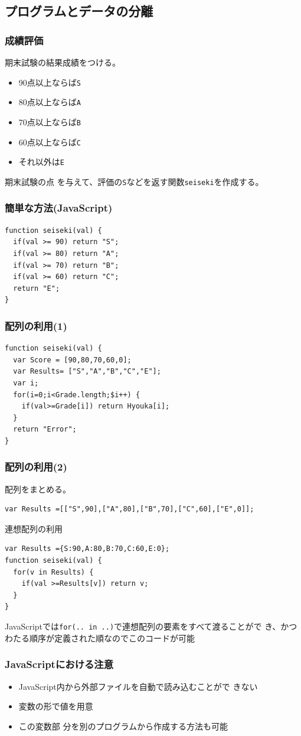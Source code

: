 \subsection{プログラムとデータの分離}
 \begin{frame}[containsverbatim]
  \frametitle{成績評価}
  期末試験の結果成績をつける。
  \begin{itemize}
   \item 90点以上ならば\texttt{S}
   \item 80点以上ならば\texttt{A}
   \item 70点以上ならば\texttt{B}
   \item 60点以上ならば\texttt{C}
   \item それ以外は\texttt{E}
  \end{itemize}
 期末試験の点
 を与えて、評価の\texttt{S}などを返す関数\texttt{seiseki}を作成する。
\end{frame}
 \begin{frame}[containsverbatim]
  \frametitle{簡単な方法(JavaScript)}
\begin{Verbatim}
function seiseki(val) {
  if(val >= 90) return "S";
  if(val >= 80) return "A";
  if(val >= 70) return "B";
  if(val >= 60) return "C";
  return "E";
}
\end{Verbatim}
\end{frame}
\begin{frame}[containsverbatim] 
\frametitle{配列の利用(1)}
\begin{Verbatim}
function seiseki(val) {
  var Score = [90,80,70,60,0];
  var Results= ["S","A","B","C","E"];
  var i;
  for(i=0;i<Grade.length;$i++) {
    if(val>=Grade[i]) return Hyouka[i];
  }
  return "Error";
}
\end{Verbatim}
\end{frame}
\begin{frame}[containsverbatim]
 \frametitle{配列の利用(2)}
 配列をまとめる。
\begin{Verbatim}
var Results =[["S",90],["A",80],["B",70],["C",60],["E",0]];
\end{Verbatim}
 連想配列の利用
\begin{Verbatim}
var Results ={S:90,A:80,B:70,C:60,E:0};
function seiseki(val) {
  for(v in Results) {
    if(val >=Results[v]) return v;
  }
}
\end{Verbatim}
JavaScriptでは\texttt{for(.. in ..)}で連想配列の要素をすべて渡ることがで
き、かつわたる順序が定義された順なのでこのコードが可能
\end{frame}
\begin{frame}[containsverbatim]
 \frametitle{JavaScriptにおける注意}
\begin{itemize}
 \item JavaScript内から外部ファイルを自動で読み込むことがで
きない
 \item 変数の形で値を用意
 \item この変数部
分を別のプログラムから作成する方法も可能
\end{itemize}
\end{frame}
